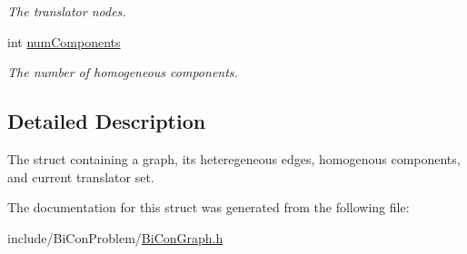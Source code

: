 \begin{DoxyCompactItemize}
\begin{DoxyCompactList}\small\item\em The translator nodes. \end{DoxyCompactList}\item 
int \hyperlink{structBiConGraph_a32eb750cae2879890a32924bb2fe8e8e}{num\+Components}\hypertarget{structBiConGraph_a32eb750cae2879890a32924bb2fe8e8e}{}\label{structBiConGraph_a32eb750cae2879890a32924bb2fe8e8e}

\begin{DoxyCompactList}\small\item\em The number of homogeneous components. \end{DoxyCompactList}\end{DoxyCompactItemize}


\subsection{Detailed Description}
The struct containing a graph, its heteregeneous edges, homogenous components, and current translator set. 

The documentation for this struct was generated from the following file\+:\begin{DoxyCompactItemize}
\item 
include/\+Bi\+Con\+Problem/\hyperlink{BiConGraph_8h}{Bi\+Con\+Graph.\+h}\end{DoxyCompactItemize}
